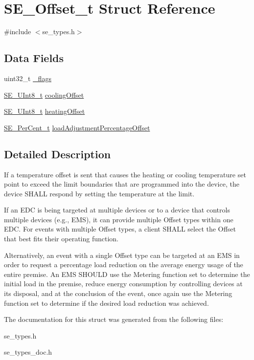 \hypertarget{structSE__Offset__t}{}\section{S\+E\+\_\+\+Offset\+\_\+t Struct Reference}
\label{structSE__Offset__t}


{\ttfamily \#include $<$se\+\_\+types.\+h$>$}

\subsection*{Data Fields}
\begin{DoxyCompactItemize}
\item 
uint32\+\_\+t \hyperlink{group__Offset_gace5a81a43bae113bcd0c8770fbd38ed2}{\+\_\+flags}
\item 
\hyperlink{group__UInt8_gaf7c365a1acfe204e3a67c16ed44572f5}{S\+E\+\_\+\+U\+Int8\+\_\+t} \hyperlink{group__Offset_ga86382d921f0bb39066867b7519d207fa}{cooling\+Offset}
\item 
\hyperlink{group__UInt8_gaf7c365a1acfe204e3a67c16ed44572f5}{S\+E\+\_\+\+U\+Int8\+\_\+t} \hyperlink{group__Offset_ga40bf7a0665bcb020988d5aaa8e0f23a7}{heating\+Offset}
\item 
\hyperlink{group__PerCent_ga14278cbee754c63496035b722b417ddc}{S\+E\+\_\+\+Per\+Cent\+\_\+t} \hyperlink{group__Offset_ga1f508f716b28a7d822a64597dd800c32}{load\+Adjustment\+Percentage\+Offset}
\end{DoxyCompactItemize}


\subsection{Detailed Description}
If a temperature offset is sent that causes the heating or cooling temperature set point to exceed the limit boundaries that are programmed into the device, the device S\+H\+A\+LL respond by setting the temperature at the limit.

If an E\+DC is being targeted at multiple devices or to a device that controls multiple devices (e.\+g., E\+MS), it can provide multiple Offset types within one E\+DC. For events with multiple Offset types, a client S\+H\+A\+LL select the Offset that best fits their operating function.

Alternatively, an event with a single Offset type can be targeted at an E\+MS in order to request a percentage load reduction on the average energy usage of the entire premise. An E\+MS S\+H\+O\+U\+LD use the Metering function set to determine the initial load in the premise, reduce energy consumption by controlling devices at its disposal, and at the conclusion of the event, once again use the Metering function set to determine if the desired load reduction was achieved. 

The documentation for this struct was generated from the following files\+:\begin{DoxyCompactItemize}
\item 
se\+\_\+types.\+h\item 
se\+\_\+types\+\_\+doc.\+h\end{DoxyCompactItemize}
